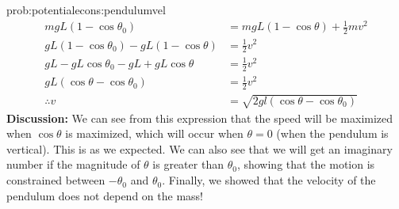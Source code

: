 \begin{solution}{prob:potentialecons:pendulumvel}
\begin{align*}
mgL(1-\cos\theta_0)&=mgL(1-\cos\theta)+\frac{1}{2}mv^2\\
gL(1-\cos\theta_0)-gL(1-\cos\theta)&=\frac{1}{2}v^2\\
gL-gL\cos\theta_0-gL+gL\cos\theta&=\frac{1}{2}v^2\\
gL(\cos\theta-\cos\theta_0)&=\frac{1}{2}v^2\\
\therefore v&=\sqrt{2gl(\cos\theta-\cos\theta_0)}
\end{align*}
\textbf{Discussion:} We can see from this expression that the speed will be maximized when $\cos\theta$ is maximized, which will occur when $\theta=0$ (when the pendulum is vertical). This is as we expected. We can also see that we will get an imaginary number if the magnitude of $\theta$ is greater than $\theta_0$, showing that the motion is constrained between $-\theta_0$ and $\theta_0$. Finally, we showed that the velocity of the pendulum does not depend on the mass!
\end{solution}

